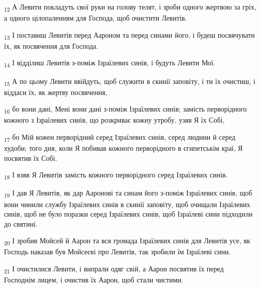 \begin{tcolorbox}
\textsubscript{12} А Левити покладуть свої руки на голову телят, і зроби одного жертвою за гріх, а одного цілопаленням для Господа, щоб очистити Левитів.
\end{tcolorbox}
\begin{tcolorbox}
\textsubscript{13} І поставиш Левитів перед Аароном та перед синами його, і будеш посвячувати їх, як посвячення для Господа.
\end{tcolorbox}
\begin{tcolorbox}
\textsubscript{14} І відділиш Левитів з-поміж Ізраїлевих синів, і будуть Левити Мої.
\end{tcolorbox}
\begin{tcolorbox}
\textsubscript{15} А по цьому Левити ввійдуть, щоб служити в скинії заповіту, і ти їх очистиш, і віддаси їх, як жертву посвячення,
\end{tcolorbox}
\begin{tcolorbox}
\textsubscript{16} бо вони дані, Мені вони дані з-поміж Ізраїлевих синів; замість перворідного кожного з Ізраїлевих синів, що розкриває кожну утробу, узяв Я їх Собі,
\end{tcolorbox}
\begin{tcolorbox}
\textsubscript{17} бо Мій кожен перворідний серед Ізраїлевих синів, серед людини й серед худоби; того дня, коли Я побивав кожного перворідного в єгипетськім краї, Я посвятив їх Собі.
\end{tcolorbox}
\begin{tcolorbox}
\textsubscript{18} І взяв Я Левитів замість кожного перворідного серед Ізраїлевих синів.
\end{tcolorbox}
\begin{tcolorbox}
\textsubscript{19} І дав Я Левитів, як дар Ааронові та синам його з-поміж Ізраїлевих синів, щоб вони чинили службу Ізраїлевих синів в скинії заповіту, щоб очищали Ізраїлевих синів, щоб не було поразки серед Ізраїлевих синів, щоб Ізраїлеві сини підходили до святині.
\end{tcolorbox}
\begin{tcolorbox}
\textsubscript{20} І зробив Мойсей й Аарон та вся громада Ізраїлевих синів для Левитів усе, як Господь наказав був Мойсеєві про Левитів, так зробили їм Ізраїлеві сини.
\end{tcolorbox}
\begin{tcolorbox}
\textsubscript{21} І очистилися Левити, і випрали одяг свій, а Аарон посвятив їх перед Господнім лицем, і очистив їх Аарон, щоб стали чистими.
\end{tcolorbox}
